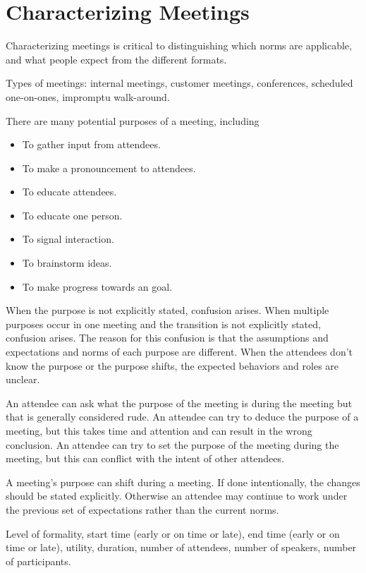 \section{Characterizing Meetings}
Characterizing meetings is critical to distinguishing which norms are applicable, and what people expect from the different formats. 



Types of meetings: internal meetings, customer meetings, conferences, scheduled one-on-ones, impromptu walk-around.   


There are many potential purposes of a meeting, including
\begin{itemize}
    \item To gather input from attendees.
    \item To make a pronouncement to attendees.
    \item To educate attendees.
    \item To educate one person.
    \item To signal interaction.
    \item To brainstorm ideas.
    \item To make progress towards an goal.
\end{itemize}
When the purpose is not explicitly stated, confusion arises. 
When multiple purposes occur in one meeting and the transition is not explicitly stated, confusion arises.
The reason for this confusion is that the assumptions and expectations and norms of each purpose are different. When the attendees don't know the purpose or the purpose shifts, the expected behaviors and roles are unclear. 

An attendee can ask what the purpose of the meeting is during the meeting but that is generally considered rude. An attendee can try to deduce the purpose of a meeting, but this takes time and attention and can result in the wrong conclusion. An attendee can try to set the purpose of the meeting during the meeting, but this can conflict with the intent of other attendees. 

A meeting's purpose can shift during a meeting. If done intentionally, the changes should be stated explicitly. Otherwise an attendee may continue to work under the previous set of expectations rather than the current norms. 



Level of formality, start time (early or on time or late), 
end time (early or on time or late), utility, 
duration, number of attendees, number of speakers, number of participants.



